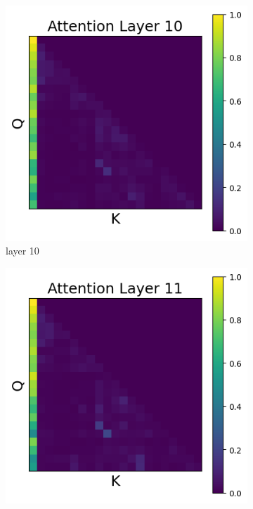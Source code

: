 \documentclass[11pt]{article}
\begin{document}
\begin{figure}[t]
    \begin{subfigure}[t]{0.24\textwidth}
    \centering
    \includegraphics[width=1.4\columnwidth]{figures/intervention4/layer_10.png}
    \caption{layer 10}
  \end{subfigure}\hfill
    \begin{subfigure}[t]{0.24\textwidth}
    \centering
    \includegraphics[width=1.4\columnwidth]{figures/intervention4/layer_11.png}

\end{subfigure}
\end{figure}
\end{document}
